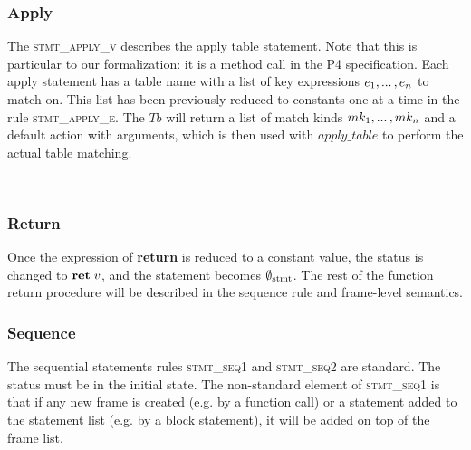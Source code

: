 \documentclass[UTF8]{article}
\begin{document}
\subsubsection*{Apply} 
The \textsc{stmt\_apply\_v} describes the apply table statement. Note that this is particular to our formalization: it is a method call in the P4 specification. Each apply statement has a table name \tn{} with a list of key expressions $e_1 , ... \, , e_n$ to match on. This list has been previously reduced to constants one at a time in the rule \textsc{stmt\_apply\_e}. The $Tb$ will return a list of match kinds $mk_1 , ... \, , mk_n$ and a default action with arguments, which is then used with $\mathit{apply\_table}$ to perform the actual table matching. %


\begin{figure}[ht!]
    \ottusedrule{\ottdrulestmtXXapplyXXtableXXe{}} \\
    \ottusedrule{\ottdrulestmtXXapplyXXtableXXv{}} 
\end{figure}

\subsubsection*{Return}
Once the expression of \textbf{return} is reduced to a constant value, the status is changed to $\textbf{ret}\;v$, and the statement becomes $\emptyset_{ \mathrm{stmt} }{}$. The rest of the function return procedure will be described in the sequence rule and frame-level semantics.

\begin{figure}[ht!]
    \ottusedrule{\ottdrulestmtXXretXXv{}} 
\end{figure}

\subsubsection*{Sequence}
The sequential statements rules \textsc{stmt\_seq1} and \textsc{stmt\_seq2} are standard. The status \status{} must be \running{} in the initial state. The non-standard element of \textsc{stmt\_seq1} is that if any new frame is created (e.g. by a function call) or a statement added to the statement list (e.g. by a block statement), it will be added on top of the frame list. \\
\end{document}
